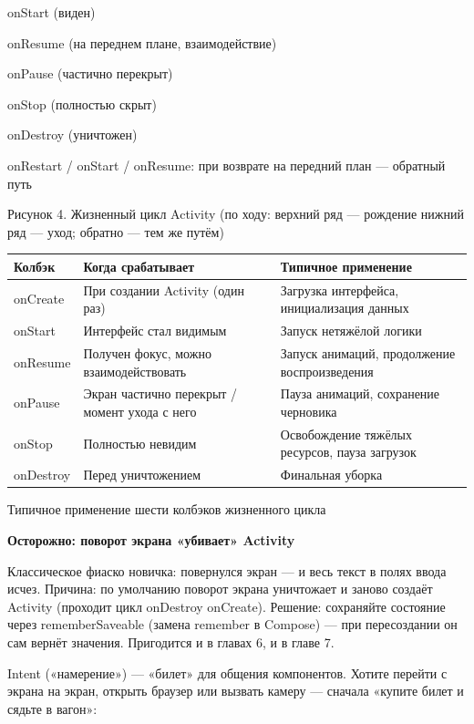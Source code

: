 onStart (виден)

onResume (на переднем плане, взаимодействие)

onPause (частично перекрыт)

onStop (полностью скрыт)

onDestroy (уничтожен)

onRestart / onStart / onResume: при возврате на передний план — обратный путь

\begin{center}\small\color{gray}Рисунок 4. Жизненный цикл Activity (по ходу: верхний ряд — рождение нижний ряд — уход; обратно — тем же путём)\end{center}

\begin{center}
\begin{tabularx}{\linewidth}{|X|X|X|}
\hline
\textbf{Колбэк} & \textbf{Когда срабатывает} & \textbf{Типичное применение} \tabularnewline
\hline
onCreate & При создании Activity (один раз) & Загрузка интерфейса, инициализация данных \tabularnewline
onStart & Интерфейс стал видимым & Запуск нетяжёлой логики \tabularnewline
onResume & Получен фокус, можно взаимодействовать & Запуск анимаций, продолжение воспроизведения \tabularnewline
onPause & Экран частично перекрыт / момент ухода с него & Пауза анимаций, сохранение черновика \tabularnewline
onStop & Полностью невидим & Освобождение тяжёлых ресурсов, пауза загрузок \tabularnewline
onDestroy & Перед уничтожением & Финальная уборка \tabularnewline
\hline
\end{tabularx}
\end{center}

\begin{center}\small\color{gray}Типичное применение шести колбэков жизненного цикла\end{center}

\textbf{Осторожно: поворот экрана «убивает» Activity}\par

Классическое фиаско новичка: повернулся экран — и весь текст в полях ввода исчез. Причина: по умолчанию поворот экрана уничтожает и заново создаёт Activity (проходит цикл onDestroy onCreate). Решение: сохраняйте состояние через rememberSaveable (замена remember в Compose) — при пересоздании он сам вернёт значения. Пригодится и в главах 6, и в главе 7.


Intent («намерение») — «билет» для общения компонентов. Хотите перейти с экрана на экран, открыть браузер или вызвать камеру — сначала «купите билет и сядьте в вагон»:

